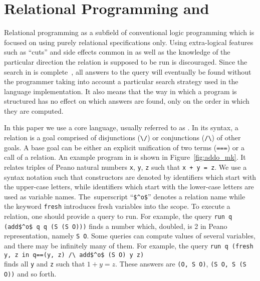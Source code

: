 \section{Relational Programming and \mk}
\label{sec:mk}








Relational programming as a subfield of conventional logic programming which is focused on using purely relational specifications only.
Using extra-logical features such as ``cuts'' and side effects common in \prolog as well as the knowledge of the particular direction the relation is supposed to be run is discouraged.
Since the search in \mk is complete~\cite{kiselyov2005backtracking,rozplokhas2020certified}, all answers to the query will eventually be found without the programmer taking into account a particular search strategy used in the language implementation.
It also means that the way in which a program is structured has no effect on which answers are found, only on the order in which they are computed.

In this paper we use a core \mk language, usually referred to as \micro.
In its syntax, a relation is a goal comprised of disjunctions (\lstinline{\/}) or conjunctions (\lstinline{/\}) of other goals.
A base goal can be either an explicit unification of two terms (\lstinline{===}) or a call of a relation.
An example program in \mk is shown in Figure~\ref{fig:addo_mk}.
It relates triples of Peano natural numbers \lstinline{x}, \lstinline{y}, \lstinline{z} such that \lstinline{x + y = z}.
We use a syntax notation such that constructors are denoted by identifiers which start with the upper-case letters, while identifiers which start with the lower-case letters are used as variable names.
The~superscript ``\lstinline{$^o$}'' denotes a relation name while the keyword \lstinline{fresh} introduces fresh variables into the scope.
To execute a relation, one should provide a query to run.
For example, the query \lstinline{run q (add$^o$ q q (S (S O)))} finds a number which, doubled, is 2 in Peano representation, namely \lstinline{S O}.
Some queries can compute values of several variables, and there may be infinitely many of them.
For example, the query \lstinline{run q (fresh y, z in q==(y, z) /\ add$^o$ (S O) y z)}
\\ finds all \lstinline{y} and \lstinline{z} such that $1 + y = z$.
These answers are \lstinline{(O, S O)}, \lstinline{(S O, S (S O))} and so forth.


